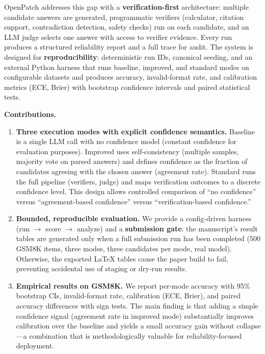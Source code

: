\documentclass[10pt]{article}
\begin{document}
OpenPatch addresses this gap with a \textbf{verification-first} architecture: multiple candidate answers are generated, programmatic verifiers (calculator, citation support, contradiction detection, safety checks) run on each candidate, and an LLM judge selects one answer with access to verifier evidence. Every run produces a structured reliability report and a full trace for audit. The system is designed for \textbf{reproducibility}: deterministic run IDs, canonical seeding, and an external Python harness that runs baseline, improved, and standard modes on configurable datasets and produces accuracy, invalid-format rate, and calibration metrics (ECE, Brier) with bootstrap confidence intervals and paired statistical tests.

\textbf{Contributions.}
\begin{enumerate}
\item \textbf{Three execution modes with explicit confidence semantics.} Baseline is a single LLM call with no confidence model (constant confidence for evaluation purposes). Improved uses self-consistency (multiple samples, majority vote on parsed answers) and defines confidence as the fraction of candidates agreeing with the chosen answer (agreement rate). Standard runs the full pipeline (verifiers, judge) and maps verification outcomes to a discrete confidence level. This design allows controlled comparison of ``no confidence'' versus ``agreement-based confidence'' versus ``verification-based confidence.''
\item \textbf{Bounded, reproducible evaluation.} We provide a config-driven harness (run $\to$ score $\to$ analyze) and a \textbf{submission gate}: the manuscript's result tables are generated only when a full submission run has been completed (500 GSM8K items, three modes, three candidates per mode, real model). Otherwise, the exported \LaTeX{} tables cause the paper build to fail, preventing accidental use of staging or dry-run results.
\item \textbf{Empirical results on GSM8K.} We report per-mode accuracy with 95\% bootstrap CIs, invalid-format rate, calibration (ECE, Brier), and paired accuracy differences with sign tests. The main finding is that adding a simple confidence signal (agreement rate in improved mode) substantially improves calibration over the baseline and yields a small accuracy gain without collapse---a combination that is methodologically valuable for reliability-focused deployment.
\end{enumerate}
\end{document}
